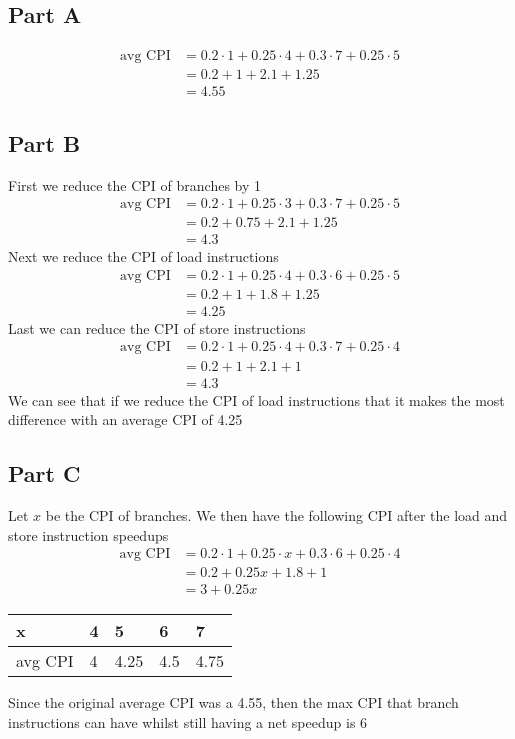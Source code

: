 \documentclass[letter]{article}
\theoremstyle{case}
\begin{document}
\subsection*{Part A}
\begin{align*}
	\text{avg CPI} &= 0.2 \cdot 1 + 0.25 \cdot 4 + 0.3 \cdot 7 + 0.25 \cdot 5 \\
&= 0.2 + 1 + 2.1 + 1.25\\
&= 4.55
\end{align*}

\subsection*{Part B}
First we reduce the CPI of branches by 1
\begin{align*}
\text{avg CPI} &= 0.2 \cdot 1 + 0.25 \cdot 3 + 0.3 \cdot 7 + 0.25 \cdot 5 \\
&= 0.2 + 0.75 + 2.1 + 1.25\\
&= 4.3
\end{align*}
Next we reduce the CPI of load instructions
\begin{align*}
\text{avg CPI} &= 0.2 \cdot 1 + 0.25 \cdot 4 + 0.3 \cdot 6 + 0.25 \cdot 5 \\
&= 0.2 + 1 + 1.8 + 1.25\\
&= 4.25
\end{align*}
Last we can reduce the CPI of store instructions
\begin{align*}
\text{avg CPI} &= 0.2 \cdot 1 + 0.25 \cdot 4 + 0.3 \cdot 7 + 0.25 \cdot 4 \\
&= 0.2 + 1 + 2.1 + 1\\
&= 4.3
\end{align*}
We can see that if we reduce the CPI of load instructions that it makes the most difference with an average CPI of 4.25

\newpage
\subsection*{Part C}
Let $x$ be the CPI of branches. We then have the following CPI after the load and store instruction speedups
\begin{align*}
\text{avg CPI} &= 0.2 \cdot 1 + 0.25 \cdot x + 0.3 \cdot 6 + 0.25 \cdot 4 \\
&= 0.2 + 0.25x + 1.8 + 1\\
&= 3 + 0.25x
\end{align*}
\begin{table}[!h]
\centering
\begin{tabular}{|l|l|l|l|l|}
\hline
x       & 4 & 5    & 6   & 7    \\ \hline
avg CPI & 4 & 4.25 & 4.5 & 4.75 \\ \hline
\end{tabular}
\end{table}
Since the original average CPI was a 4.55, then the max CPI that branch instructions can have whilst still having a net speedup is 6
\end{document}
